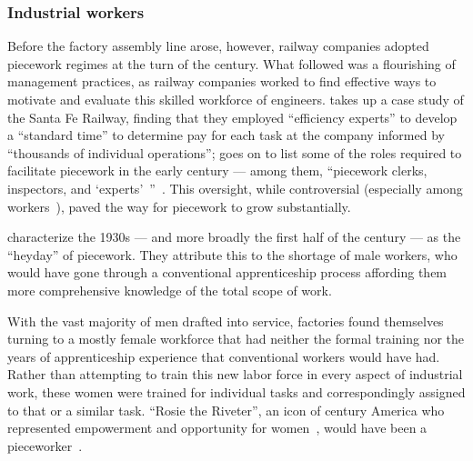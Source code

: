 \documentclass[trackingWork]{subfiles}
\begin{document}
\subsubsection{Industrial workers}
Before the factory assembly line arose, however, railway companies adopted piecework regimes at the turn of the  century.
What followed was a flourishing of management practices,
as railway companies worked to find effective ways
to motivate and evaluate this skilled workforce of engineers.
\citeauthor{10.2307/23702539} takes up a case study of the Santa Fe Railway,
finding that they employed ``efficiency experts'' to develop a ``standard time''
to determine pay for each task at the company informed by
``thousands of individual operations'';
\citeauthor{10.2307/23702539} goes on to list
some of the roles required to facilitate piecework
in the early  century
--- among them, ``piecework clerks, inspectors, and `experts'~''~\cite{10.2307/23702539}.
This oversight, while controversial
(especially among workers~\cite{american1921problem}),
paved the way for piecework to grow substantially.

\citeauthor{hart2013rise} characterize the 1930s
--- and more broadly the first half of the  century ---
as the ``heyday'' of piecework.
They attribute this to the shortage of male workers,
who would have gone through a conventional apprenticeship process
affording them more comprehensive knowledge of the total scope of work.

With the vast majority of men drafted into service,
factories found themselves turning to
a mostly female workforce that had neither
the formal training nor
the years of apprenticeship experience
that conventional workers would have had.
Rather than attempting to train this new labor force in every aspect of industrial work,
these women were trained for individual tasks
and correspondingly assigned to that or a similar task.
``Rosie the Riveter'',
an icon of  century America who
represented empowerment and opportunity for women~\cite{honey1985creating},
would have been a pieceworker~\cite{davies2014origins}. 


\begin{comment}
What did I pull from the threads that are related to industrial and railroad workers (i.e. 1920 onward?)

- Graves: railway companies used ``efficiency experts'' to study how long tasks should take
- Hart: evaluation limits complexity (we can affect that with peer evaluation!)
- Graves: sparks of Scientific Management in Piecework
- organization types are important determinants of piecework viability: lots of types of tasks? bad
  - Hart (I think?): variability in *worker* quality is fine
- Foreman is important
- Worker advocacy groups arose to speak out against piecework

\end{comment}
\end{document}
